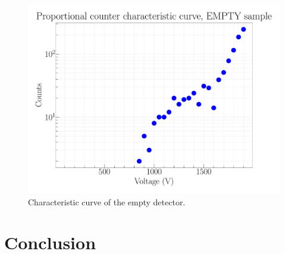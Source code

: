 \begin{figure}[H]
\centering
\includegraphics[width=\textwidth]{../Figures/Proportional_characteristic_curve_EMPTY.pdf}
\caption{Characteristic curve of the empty detector.}
\label{fig:EmptyChar}
\end{figure}

\section{Conclusion}




